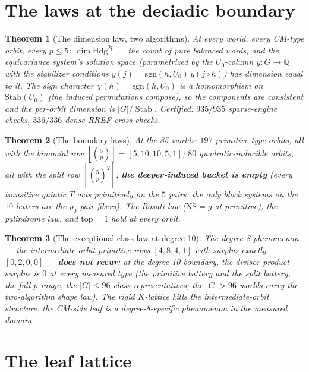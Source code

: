\documentclass[11pt]{article}
\newtheorem{theorem}{Theorem}
\newcommand{\Q}{\mathbb{Q}}
\begin{document}
\section{The laws at the deciadic boundary}

\begin{theorem}[The dimension law, two algorithms]
At every world, every CM-type orbit, every $p \le 5$:
$\dim \mathrm{Hdg}^{2p} = $ the count of pure balanced words, and the
equivariance system's solution space (parametrized by the $U_0$-column
$y : G \to \Q$ with the stabilizer conditions
$y(j) = \mathrm{sgn}(h, U_0)\, y(j \circ h)$) has dimension equal to it.
The sign character $\chi(h) = \mathrm{sgn}(h, U_0)$ is a homomorphism on
$\mathrm{Stab}(U_0)$ (the induced permutations compose), so the components
are consistent and the per-orbit dimension is $|G|/|\mathrm{Stab}|$.
Certified: $935/935$ sparse-engine checks, $336/336$ dense-RREF
cross-checks.
\end{theorem}

\begin{theorem}[The boundary laws]
At the 85 worlds: $197$ primitive type-orbits, all with the binomial row
$[\binom{5}{p}] = [5,10,10,5,1]$; $80$ quadratic-inducible orbits, all with
the split row $[\binom{5}{p}^2]$; \textbf{the deeper-induced bucket is
empty} (every transitive quintic $T$ acts primitively on the $5$ pairs: the
only block systems on the $10$ letters are the $\rho_0$-pair fibers). The
Rosati law ($\mathrm{NS} = g$ at primitive), the palindrome law, and
$\mathrm{top} = 1$ hold at every orbit.
\end{theorem}

\begin{theorem}[The exceptional-class law at degree 10]
The degree-8 phenomenon --- the intermediate-orbit primitive rows
$[4,8,4,1]$ with surplus exactly $[0,2,0,0]$ --- \textbf{does not recur}:
at the degree-10 boundary, the divisor-product surplus is $0$ at every
measured type (the primitive battery and the split battery, the full
$p$-range, the $|G| \le 96$ class representatives; the $|G| > 96$ worlds
carry the two-algorithm shape law). The rigid $K$-lattice kills the
intermediate-orbit structure: \emph{the CM-side leaf is a degree-8-specific
phenomenon in the measured domain.}
\end{theorem}

\section{The leaf lattice}
\end{document}
